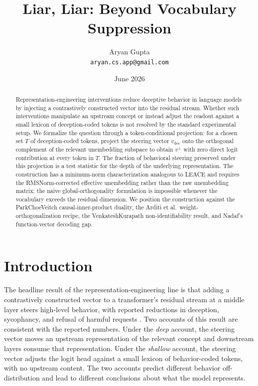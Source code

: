 \documentclass[11pt,letterpaper]{article}
\title{\Large \textbf{Liar, Liar: Beyond Vocabulary Suppression}}
\author{Aryan Gupta\\\small\texttt{aryan.cs.app@gmail.com}}
\date{June 2026}
\theoremstyle{plain}
\theoremstyle{definition}
\newcommand{\1}{\mathbf{1}}
\newcommand{\vdec}{v_{\text{dec}}}
\newcommand{\vperp}{v^{\perp}}
\begin{document}
\maketitle

\begin{abstract}
\noindent
Representation-engineering interventions reduce deceptive behavior in language models by injecting a contrastively constructed vector into the residual stream. Whether such interventions manipulate an upstream concept or instead adjust the readout against a small lexicon of deception-coded tokens is not resolved by the standard experimental setup. We formalize the question through a token-conditional projection: for a chosen set $T$ of deception-coded tokens, project the steering vector $\vdec$ onto the orthogonal complement of the relevant unembedding subspace to obtain $\vperp$ with zero direct logit contribution at every token in $T$. The fraction of behavioral steering preserved under this projection is a test statistic for the depth of the underlying representation. The construction has a minimum-norm characterization analogous to LEACE and requires the RMSNorm-corrected effective unembedding rather than the raw unembedding matrix; the naive global-orthogonality formulation is impossible whenever the vocabulary exceeds the residual dimension. We position the construction against the Park\textendash Choe\textendash Veitch causal-inner-product duality, the Arditi et al.\ weight-orthogonalization recipe, the Venkatesh\textendash Kurapath non-identifiability result, and Nadaf's function-vector decoding gap.
\end{abstract}

\section{Introduction}\label{sec:intro}

The headline result of the representation-engineering line is that adding a contrastively constructed vector to a transformer's residual stream at a middle layer steers high-level behavior, with reported reductions in deception, sycophancy, and refusal of harmful requests \cite{zou2023repe,rimsky2024caa,li2023iti,arditi2024refusal}. Two accounts of this result are consistent with the reported numbers. Under the \emph{deep} account, the steering vector moves an upstream representation of the relevant concept and downstream layers consume that representation. Under the \emph{shallow} account, the steering vector adjusts the logit head against a small lexicon of behavior-coded tokens, with no upstream content. The two accounts predict different behavior off-distribution and lead to different conclusions about what the model represents.
\end{document}
